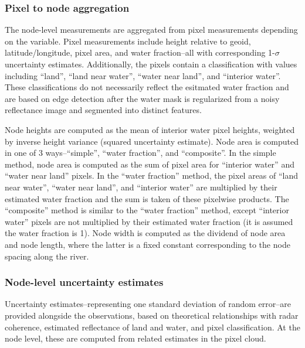 \documentclass[]{book}
\begin{document}
\hypertarget{pixel-to-node-aggregation}{%
\subsubsection{Pixel to node aggregation}\label{pixel-to-node-aggregation}}

The node-level measurements are aggregated from pixel measurements depending on the variable. Pixel measurements include height relative to geoid, latitude/longitude, pixel area, and water fraction--all with corresponding 1-\(\sigma\) uncertainty estimates. Additionally, the pixels contain a classification with values including ``land'', ``land near water'', ``water near land'', and ``interior water''. These classifications do not necessarily reflect the esitmated water fraction and are based on edge detection after the water mask is regularized from a noisy reflectance image and segmented into distinct features.

Node heights are computed as the mean of interior water pixel heights, weighted by inverse height variance (squared uncertainty estimate). Node area is computed in one of 3 ways--``simple'', ``water fraction'', and ``composite''. In the simple method, node area is computed as the sum of pixel area for ``interior water'' and ``water near land'' pixels. In the ``water fraction'' method, the pixel areas of ``land near water'', ``water near land'', and ``interior water'' are multiplied by their estimated water fraction and the sum is taken of these pixelwise products. The ``composite'' method is similar to the ``water fraction'' method, except ``interior water'' pixels are not multiplied by their estimated water fraction (it is assumed the water fraction is 1). Node width is computed as the dividend of node area and node length, where the latter is a fixed constant corresponding to the node spacing along the river.

\hypertarget{node-level-uncertainty-estimates}{%
\subsubsection{Node-level uncertainty estimates}\label{node-level-uncertainty-estimates}}

Uncertainty estimates--representing one standard deviation of random error--are provided alongside the observations, based on theoretical relationships with radar coherence, estimated reflectance of land and water, and pixel classification. At the node level, these are computed from related estimates in the pixel cloud.
\end{document}
